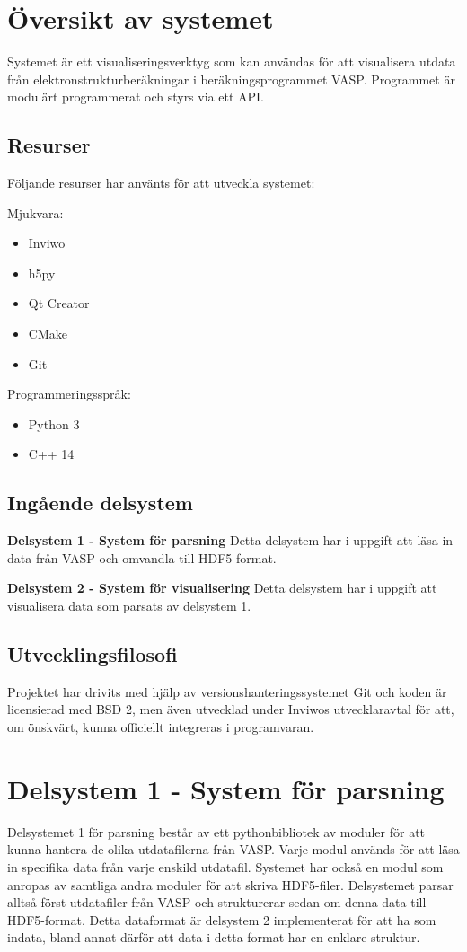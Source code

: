 \documentclass[a4paper,12pt]{article}
\begin{document}
\section{Översikt av systemet}
Systemet är ett visualiseringsverktyg som kan användas för att visualisera utdata från elektronstrukturberäkningar i beräkningsprogrammet VASP. Programmet är modulärt programmerat och styrs via ett API.

\subsection{Resurser}
Följande resurser har använts för att utveckla systemet:

Mjukvara:
\begin{itemize}
\setlength\itemsep{0em}
\item Inviwo
\item h5py
\item Qt Creator
\item CMake
\item Git
\end{itemize}

Programmeringsspråk:
\begin{itemize}
\setlength\itemsep{0em}
\item Python 3
\item C++ 14
\end{itemize}

\subsection{Ingående delsystem}
\textbf{Delsystem 1 - System för parsning}
\newline Detta delsystem har i uppgift att läsa in data från VASP och omvandla till HDF5-format.

\textbf{Delsystem 2 - System för visualisering}
\newline Detta delsystem har i uppgift att visualisera data som parsats av delsystem 1.

\subsection{Utvecklingsfilosofi}
Projektet har drivits med hjälp av versionshanteringssystemet Git och koden är licensierad med BSD 2, men även utvecklad under Inviwos utvecklaravtal för att, om önskvärt, kunna officiellt integreras i programvaran.

\section{Delsystem 1 - System för parsning}
Delsystemet 1 för parsning består av ett pythonbibliotek av moduler för att kunna hantera de olika utdatafilerna från VASP. Varje modul används för att läsa in specifika data från varje enskild utdatafil. Systemet har också en modul som anropas av samtliga andra moduler för att skriva HDF5-filer. Delsystemet parsar alltså först utdatafiler från VASP och strukturerar sedan om denna data till HDF5-format. Detta dataformat är delsystem 2 implementerat för att ha som indata, bland annat därför att data i detta format har en enklare struktur.
\end{document}
